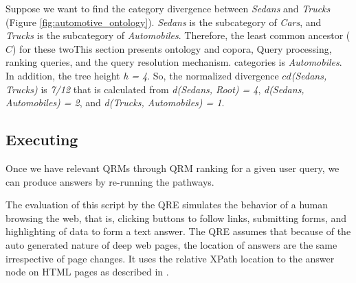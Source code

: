 Suppose we want to find the category divergence between \textit{Sedans}
and \textit{Trucks} (Figure \ref{fig:automotive_ontology}). 
\textit{Sedans} is the subcategory of \textit{Cars}, and \textit{Trucks}
is the subcategory of \textit{Automobiles}. Therefore, the least common ancestor ($C$)
for these twoThis section presents ontology and copora, Query processing, ranking queries, and the query resolution mechanism. categories is \textit{Automobiles}. In addition, the tree height \textit{h = 4}.
So, the normalized divergence $cd$\textit{(Sedans, Trucks)} is \textit{7/12}
that is calculated from \textit{d(Sedans, Root) = 4}, \textit{d(Sedans, Automobiles) = 2}, and \textit{d(Trucks, Automobiles) = 1}.


\subsection{Executing} 

Once we have relevant QRMs through QRM ranking for a given user query, we can produce answers by re-running the pathways.

 The evaluation of this script by the QRE simulates the behavior of a human browsing the web, that is, clicking buttons to follow links, submitting forms, and highlighting of data to form a text answer.  The QRE assumes that because of the auto generated nature of deep web pages, the location of answers are the same irrespective of page changes.  It uses the relative XPath location to the answer node on HTML pages as described in \cite{Badica06}.


